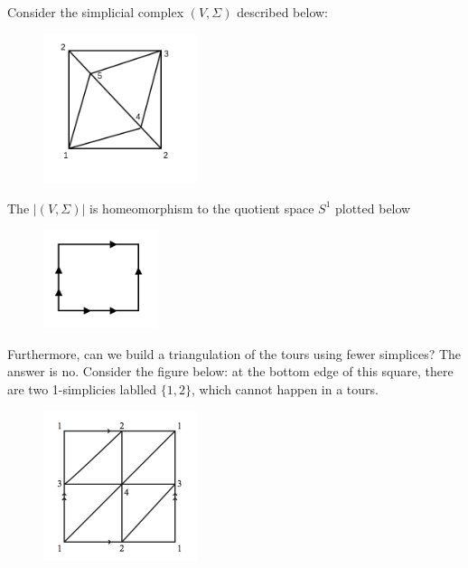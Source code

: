 \begin{example}
Consider the simplicial complex $(V,\Sigma)$ described below:
\begin{figure}[H]
\centering
\includegraphics[width=0.4\textwidth]{week7/p_12}
\end{figure}
The $|(V,\Sigma)|$ is homeomorphism to the quotient space $S^1$ plotted below
\begin{figure}[H]
\centering
\includegraphics[width=0.3\textwidth]{week7/p_13}
\end{figure}
\end{example}





Furthermore, can we build a triangulation of the tours using fewer simplices? The answer is no.
Consider the figure below: at the bottom edge of this square, there are two 1-simplicies lablled $\{1,2\}$, which cannot happen in a tours.
\begin{figure}[H]
\centering
\includegraphics[width=0.4\textwidth]{week7/p_14}
\end{figure}

